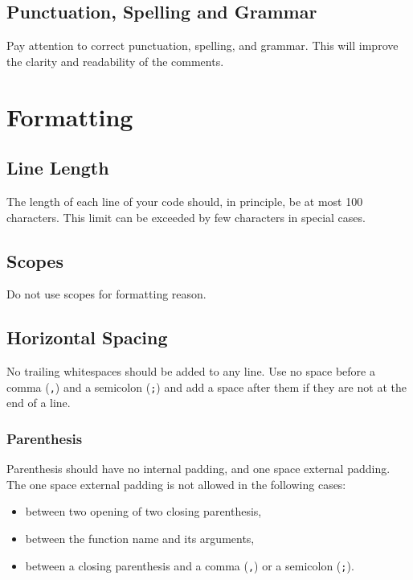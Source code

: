 \documentclass[a4paper]{article}
\newcommand{\inlinecode}[1]{\lstinline|#1|}
\begin{document}
\subsection{Punctuation, Spelling and Grammar}

Pay attention to correct punctuation, spelling, and grammar. This will improve the clarity and readability of the comments.

\section{Formatting}

\subsection{Line Length}

The length of each line of your code should, in principle, be at most 100 characters. This limit can be exceeded by few characters in special cases.

\subsection{Scopes}

Do not use scopes for formatting reason.

\subsection{Horizontal Spacing}

No trailing whitespaces should be added to any line.
Use no space before a comma (\inlinecode{,}) and a semicolon (\inlinecode{;}) and add a space after them if they are not at the end of a line.

\subsubsection{Parenthesis}

Parenthesis should have no internal padding, and one space external padding.
The one space external padding is not allowed in the following cases:
\begin{itemize} \itemsep -3pt
 \vspace{-2ex}
 \item between two opening of two closing parenthesis,
 \item between the function name and its arguments,
 \item between a closing parenthesis and a comma (\inlinecode{,}) or a semicolon (\inlinecode{;}).
\end{itemize}
\end{document}
